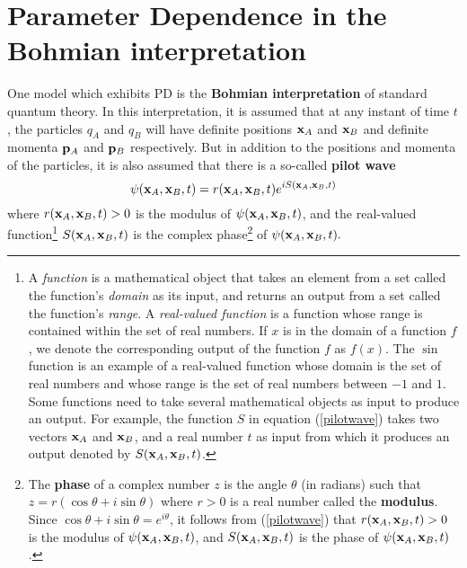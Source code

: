
\section{Parameter Dependence in the Bohmian interpretation}\label{PI}
One model which exhibits PD is the \textbf{Bohmian interpretation} of standard quantum theory. In this interpretation, it is assumed that at any instant of time $t$, the particles $q_A$ and $q_B$ will have definite positions $\vb{x}_A$ and $\vb{x}_B$ %
%
and definite momenta $\vb{p}_A$ and $\vb{p}_B$ %
%
respectively. But in addition to the positions and momenta of the particles, it is also assumed that there is a so-called \textbf{pilot wave} 
\begin{equation}\label{pilotwave}
\psi(\vb{x}_A, \vb{x}_B, t)=r(\vb{x}_A, \vb{x}_B, t)e^{i S(\vb{x}_A, \vb{x}_B, t)} 
\end{equation}where $r(\vb{x}_A, \vb{x}_B, t)>0$ %
%
is the modulus of $\psi(\vb{x}_A, \vb{x}_B, t)$, %
%
and the real-valued function\footnote{A \emph{function} is a mathematical object that takes an element from a set called the function's \emph{domain} as its input, and returns an output from a set called the function's \emph{range}. A \emph{real-valued function} is a function whose range is contained within the set of real numbers. If $x$ is in the domain of a function $f$, we denote the corresponding output of the function $f$ as $f(x)$. The $\sin$ function is an example of a real-valued function whose domain is the set of real numbers and whose range is the set of real numbers between $-1$ and $1$. Some functions need to  take several mathematical objects as input to produce an output. For example, the function $S$ in equation (\ref{pilotwave}) takes two vectors $\vb{x}_A$ and $\vb{x}_B$, and a real number $t$ as input from which it produces an output denoted by $S(\vb{x}_A, \vb{x}_B, t)$.} $S(\vb{x}_A, \vb{x}_B,t )$ is %
%
the complex phase\footnote{The \textbf{phase} of a complex number $z$ is the angle $\theta$ (in radians) such that $z=r(\cos \theta + i \sin \theta)$ where $r>0$ is a real number called the \textbf{modulus}. Since $\cos \theta + i\sin \theta=e^{i \theta}$, %
%
it follows from (\ref{pilotwave}) that $r(\vb{x}_A, \vb{x}_B, t)>0$ is the modulus of $\psi(\vb{x}_A, \vb{x}_B, t)$, and $S(\vb{x}_A, \vb{x}_B,t )$ is the phase of $\psi(\vb{x}_A, \vb{x}_B, t)$.} of $\psi(\vb{x}_A, \vb{x}_B, t).$
